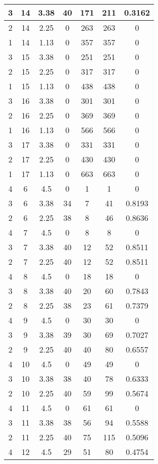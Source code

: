 \documentclass[letterpaper, 12pt]{article}
\begin{document}
\begin{longtable}{|c|c|c|c|c|c|c|}
\hline
3 & 14 & 3.38 & 40 & 171 & 211 & 0.3162 \\
\hline
2 & 14 & 2.25 & 0 & 263 & 263 & 0 \\
\hline
1 & 14 & 1.13 & 0 & 357 & 357 & 0 \\
\hline
3 & 15 & 3.38 & 0 & 251 & 251 & 0 \\
\hline
2 & 15 & 2.25 & 0 & 317 & 317 & 0 \\
\hline
1 & 15 & 1.13 & 0 & 438 & 438 & 0 \\
\hline
3 & 16 & 3.38 & 0 & 301 & 301 & 0 \\
\hline
2 & 16 & 2.25 & 0 & 369 & 369 & 0 \\
\hline
1 & 16 & 1.13 & 0 & 566 & 566 & 0 \\
\hline
3 & 17 & 3.38 & 0 & 331 & 331 & 0 \\
\hline
2 & 17 & 2.25 & 0 & 430 & 430 & 0 \\
\hline
1 & 17 & 1.13 & 0 & 663 & 663 & 0 \\
\hline
4 & 6 & 4.5 & 0 & 1 & 1 & 0 \\
\hline
3 & 6 & 3.38 & 34 & 7 & 41 & 0.8193 \\
\hline
2 & 6 & 2.25 & 38 & 8 & 46 & 0.8636 \\
\hline
4 & 7 & 4.5 & 0 & 8 & 8 & 0 \\
\hline
3 & 7 & 3.38 & 40 & 12 & 52 & 0.8511 \\
\hline
2 & 7 & 2.25 & 40 & 12 & 52 & 0.8511 \\
\hline
4 & 8 & 4.5 & 0 & 18 & 18 & 0 \\
\hline
3 & 8 & 3.38 & 40 & 20 & 60 & 0.7843 \\
\hline
2 & 8 & 2.25 & 38 & 23 & 61 & 0.7379 \\
\hline
4 & 9 & 4.5 & 0 & 30 & 30 & 0 \\
\hline
3 & 9 & 3.38 & 39 & 30 & 69 & 0.7027 \\
\hline
2 & 9 & 2.25 & 40 & 40 & 80 & 0.6557 \\
\hline
4 & 10 & 4.5 & 0 & 49 & 49 & 0 \\
\hline
3 & 10 & 3.38 & 38 & 40 & 78 & 0.6333 \\
\hline
2 & 10 & 2.25 & 40 & 59 & 99 & 0.5674 \\
\hline
4 & 11 & 4.5 & 0 & 61 & 61 & 0 \\
\hline
3 & 11 & 3.38 & 38 & 56 & 94 & 0.5588 \\
\hline
2 & 11 & 2.25 & 40 & 75 & 115 & 0.5096 \\
\hline
4 & 12 & 4.5 & 29 & 51 & 80 & 0.4754 \\

\end{longtable}
\end{document}
